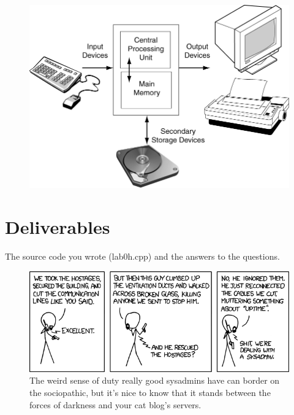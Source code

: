\documentclass[letterpaper,12pt]{article}
\begin{document}
\begin{figure}[h!]
    \centering
    \includegraphics[width=5in]{graphic.png}
\end{figure}

\section*{Deliverables}
The source code you wrote (lab0h.cpp) and the answers to the questions.

\begin{figure}[ht!]
	\centering
	\includegraphics[width=5in]{devotion_to_duty.png}
	\caption*{The weird sense of duty really good sysadmins have can border on the sociopathic, 
		but it's nice to know that it stands between the forces of darkness and your cat blog's servers.}
\end{figure}
\end{document}
